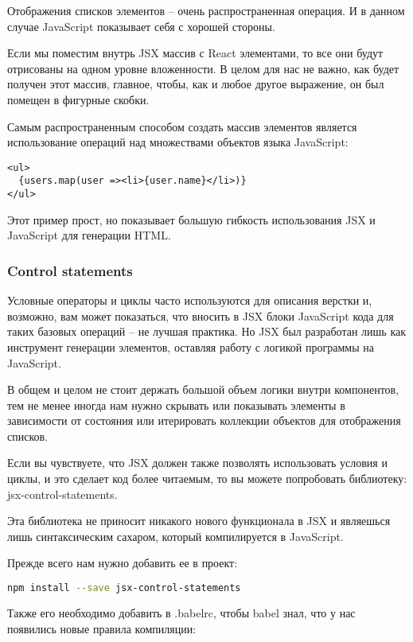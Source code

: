 Отображения списков элементов -- очень распространенная операция. И в данном случае JavaScript показывает себя с хорошей стороны.

Если мы поместим внутрь JSX массив с React элементами, то все они будут отрисованы на одном уровне вложенности. В целом для нас не важно, как будет получен этот массив, главное, чтобы, как и любое другое выражение, он был помещен в фигурные скобки.

Самым распространенным способом создать массив элементов является использование операций над множествами объектов языка JavaScript:

\begin{lstlisting}
<ul>
  {users.map(user =><li>{user.name}</li>)}
</ul>
\end{lstlisting}

Этот пример прост, но показывает большую гибкость использования JSX и JavaScript для генерации HTML.

\subsubsection{Control statements}

Условные операторы и циклы часто используются для описания верстки и, возможно, вам может показаться, что вносить в JSX блоки JavaScript кода для таких базовых операций -- не лучшая практика. Но JSX был разработан лишь как инструмент генерации элементов, оставляя работу с логикой программы на JavaScript.

В общем и целом не стоит держать большой объем логики внутри компонентов, тем не менее иногда нам нужно скрывать или показывать элементы в зависимости от состояния или итерировать коллекции объектов для отображения списков.

Если вы чувствуете, что JSX должен также позволять использовать условия и циклы, и это сделает код более читаемым, то вы можете попробовать библиотеку: jsx-control-statements.

Эта библиотека не приносит никакого нового функционала в JSX и являешься лишь синтаксическим сахаром, который компилируется в JavaScript.

Прежде всего нам нужно добавить ее в проект:

\begin{lstlisting}[language=bash]
npm install --save jsx-control-statements
\end{lstlisting}

Также его необходимо добавить в .babelrc, чтобы babel знал, что у нас появились новые правила компиляции:

